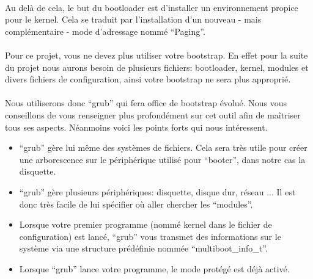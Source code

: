 \documentclass[10pt,a4wide]{article}
\begin{document}
\paragraph{}

Au del\`a de cela, le but du bootloader est d'installer un environnement
propice pour le kernel. Cela se traduit par l'installation d'un nouveau -
mais compl\'ementaire - mode d'adressage nomm\'e ``Paging''.

\paragraph{}

Pour ce projet, vous ne devez plus utiliser votre bootstrap. En effet pour
la suite du projet nous aurons besoin de plusieurs fichiers: bootloader,
kernel, modules et divers fichiers de configuration, ainsi votre bootstrap
ne sera plus appropri\'e.

\paragraph{}

Nous utiliserons donc ``grub'' qui fera office de bootstrap \'evolu\'e. Nous
vous conseillons de vous renseigner plus profond\'ement sur cet outil
afin de ma\^itriser tous ses aspects. N\'eanmoins voici les points forts
qui nous int\'eressent.

\begin{itemize}

\item ``grub'' g\`ere lui m\^eme des syst\`emes de fichiers. Cela sera tr\`es
      utile pour cr\'eer une arborescence sur le p\'eriph\'erique utilis\'e
      pour ``booter'', dans notre cas la disquette.
\item ``grub'' g\`ere plusieurs p\'eriph\'eriques: disquette, disque dur,
      r\'eseau ... Il est donc tr\`es facile de lui sp\'ecifier o\`u aller
      chercher les ``modules''.
\item Lorsque votre premier programme (nomm\'e kernel dans le fichier de
      configuration) est lanc\'e, ``grub'' vous transmet des informations
      sur le syst\`eme via une structure pr\'ed\'efinie nomm\'ee
      ``multiboot\_info\_t''.
\item Lorsque ``grub'' lance votre programme, le mode prot\'eg\'e est d\'ej\`a
      activ\'e.

\end{itemize}

\paragraph{}
\end{document}
